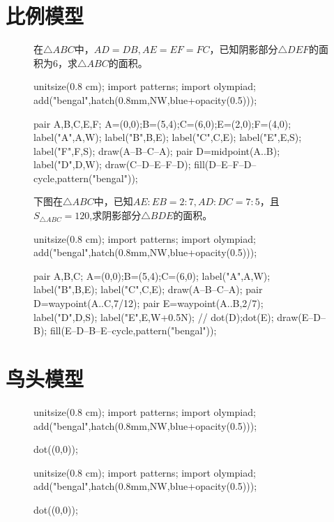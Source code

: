 \documentclass[12pt,space]{ctexart} %
\begin{document}
\section{比例模型}
\begin{figure}[ht]
	\begin{minipage}[b]{0.4\textwidth}
		在$\triangle ABC$中，$AD=DB,AE=EF=FC$，已知阴影部分$\triangle DEF$的面积为6，求$\triangle ABC$的面积。\\
		\begin{asy}
			unitsize(0.8 cm);
			import patterns;
			import olympiad;
			add("bengal",hatch(0.8mm,NW,blue+opacity(0.5)));

			pair A,B,C,E,F;
			A=(0,0);B=(5,4);C=(6,0);E=(2,0);F=(4,0);
			label("A",A,W);
			label("B",B,E);
			label("C",C,E);
			label("E",E,S);
			label("F",F,S);
			draw(A--B--C--A);
			pair D=midpoint(A..B);
			label("D",D,W);
			draw(C--D--E--F--D);
			fill(D--E--F--D--cycle,pattern("bengal"));
		\end{asy}
	\end{minipage}
	\qquad
	\begin{minipage}[b]{0.45\textwidth}
		下图在$\triangle ABC$中，已知$AE:EB=2:7,AD:DC=7:5$，且$S_{\triangle ABC}=120$,求阴影部分$\triangle BDE$的面积。\\
		\begin{asy}
			unitsize(0.8 cm);
			import patterns;
			import olympiad;
			add("bengal",hatch(0.8mm,NW,blue+opacity(0.5)));

			pair A,B,C;
			A=(0,0);B=(5,4);C=(6,0);
			label("A",A,W);
			label("B",B,E);
			label("C",C,E);
			draw(A--B--C--A);
			pair D=waypoint(A..C,7/12);
			pair E=waypoint(A..B,2/7);
			label("D",D,S);
			label("E",E,W+0.5N);
			// dot(D);dot(E);
			draw(E--D--B);
			fill(E--D--B--E--cycle,pattern("bengal"));

		\end{asy}
	\end{minipage}
\end{figure}
\section{鸟头模型}
\begin{figure}[ht]
	\begin{minipage}[b]{0.4\textwidth}
		\begin{asy}
			unitsize(0.8 cm);
			import patterns;
			import olympiad;
			add("bengal",hatch(0.8mm,NW,blue+opacity(0.5)));

			dot((0,0));
		\end{asy}
	\end{minipage}
	\qquad
	\begin{minipage}[b]{0.45\textwidth}
		\begin{asy}
			unitsize(0.8 cm);
			import patterns;
			import olympiad;
			add("bengal",hatch(0.8mm,NW,blue+opacity(0.5)));

			dot((0,0));
		\end{asy}
	\end{minipage}
\end{figure}
\end{document}
